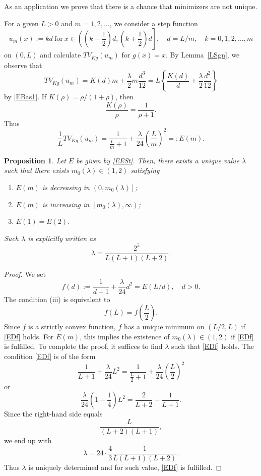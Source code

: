 \documentclass[12pt, reqno]{amsart}
\numberwithin{equation}{section}
\newtheorem{prop}[thm]{Proposition}
\begin{document}
As an application we prove that there is a chance that minimizers are not unique.

For a given $L>0$ and $m=1,2,\ldots$, we consider a step function
\begin{equation} \label{EStm}
    u_m(x) := kd \ \text{for}\ 
    x \in \left( \left(k-\frac12\right)d, \left(k+\frac12\right)d \right], \quad
    d=L/m, \quad
    k=0,1,2,\ldots,m
\end{equation}
on $(0,L)$ and calculate $TV_{Kg}(u_m)$ for $g(x)=x$.
 By Lemma~\ref{LSgn}, we observe that
\[
    TV_{Kg}(u_m)
    = K(d)m + \frac\lambda2 m \frac{d^3}{12}
    = L \left\{ \frac{K(d)}{d} + \frac\lambda2\frac{d^2}{12} \right\}
\]
by \eqref{EBas1}.
 If $K(\rho)=\rho/(1+\rho)$, then
\[
    \frac{K(\rho)}{\rho}
    = \frac{1}{\rho+1}.
\]
Thus
\begin{equation} \label{EESt}
    \frac1L TV_{Kg}(u_m)
    = \frac{1}{\frac{L}{m}+1} + \frac{\lambda}{24} \left(\frac{L}{m} \right)^2
    =: E(m).
\end{equation}
%
\begin{prop} \label{PCal}
Let $E$ be given by \eqref{EESt}.
 Then, there exists a unique value $\lambda$ such that there exists $m_0(\lambda)\in(1,2)$ satisfying
\begin{enumerate}
\item[(i)] $E(m)$ is decreasing in $\left(0,m_0(\lambda)\right]$;
\item[(i\hspace{-0.1em}i)] $E(m)$ is increasing in $\left[m_0(\lambda), \infty\right)$;
\item[(i\hspace{-0.1em}i\hspace{-0.1em}i)] $E(1)=E(2)$.
\end{enumerate}
Such $\lambda$ is explicitly written as
\[
	\lambda = \frac{2^5}{L(L+1)(L+2)}.
\]
\end{prop}
%
\begin{proof}
We set
\[
    f(d) := \frac{1}{d+1} + \frac{\lambda}{24} d^2
    = E(L/d), \quad d>0.
\]
The condition (i\hspace{-0.1em}i\hspace{-0.1em}i) is equivalent to
\begin{equation} \label{EDf}
    f(L) = f\left( \frac{L}{2} \right).
\end{equation}
Since $f$ is a strictly convex function, $f$ has a unique minimum on $(L/2,L)$ if \eqref{EDf} holds.
 For $E(m)$, this implies the existence of $m_0(\lambda)\in(1,2)$ if \eqref{EDf} is fulfilled.
 To complete the proof, it suffices to find $\lambda$ such that \eqref{EDf} holds.
 The condition \eqref{EDf} is of the form
\[
	\frac{1}{L+1} + \frac{\lambda}{24} L^2
	= \frac{1}{\frac{L}{2}+1} + \frac{\lambda}{24} \left( \frac{L}{2} \right)^2
\]
or
\[
	\frac{\lambda}{24} \left( 1-\frac14 \right) L^2
	= \frac{2}{L+2} - \frac{1}{L+1}.
\]
Since the right-hand side equals
\[
	\frac{L}{(L+2)(L+1)},
\]
we end up with
\[
	\lambda = 24 \cdot \frac43 \frac{1}{L(L+1)(L+2)}.
\]
Thus $\lambda$ is uniquely determined and for such value, \eqref{EDf} is fulfilled.
\end{proof}
\end{document}
